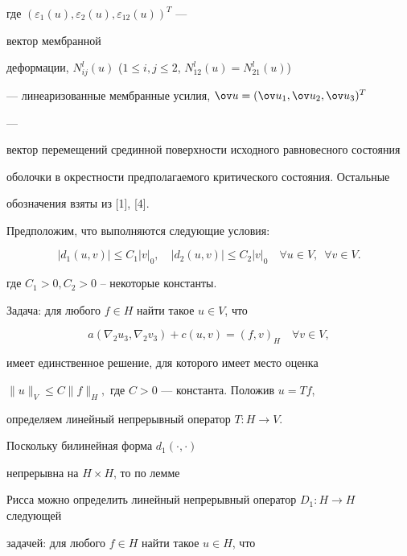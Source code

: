 где $(\varepsilon_1(u),\varepsilon_2(u),\varepsilon_{12}(u))^T$ ---


вектор мембранной


деформации, $N_{ij}^{l}(u)$ ($1\le i,j\le 2$, $N_{12}^{l}(u)=N_{21}^{l}(u)$)


--- линеаризованные мембранные усилия, $\ov u=(\ov u_1,\ov u_2,\ov u_3)^T$


---


вектор перемещений срединной поверхности исходного равновесного состояния


оболочки в окрестности предполагаемого критического состояния. Остальные


обозначения взяты из [1], [4].





Предположим, что выполняются следующие условия:


\begin{equation}


|d_1(u,v)|\le C_1|v|_0, \quad |d_2(u,v)|\le C_2|v|_0


\quad \forall u \in V,\; \ \forall v \in V.


\end{equation}


где $C_1>0,C_2>0$ -- некоторые константы.


\medskip





Задача: для любого $f \in H $ найти такое $u \in V$, что


$$


a(\nabla_2{u_3},\nabla_2{v_3})+c(u,v)=(f,v)_H \quad \forall v \in V,


$$


имеет единственное решение, для которого имеет место оценка


$\|u\|_V\le C \|f\|_H,$ где $C>0$ --- константа. Положив $u=Tf$,


определяем линейный непрерывный оператор $T:H\to V$.


\medskip





Поскольку билинейная форма $d_1(\cdot,\cdot)$


непрерывна на $H\times H$, то по лемме


Рисса можно определить линейный непрерывный оператор $D_1:H\to H$ следующей


задачей: для любого $f \in H $ найти такое $u \in H$, что


